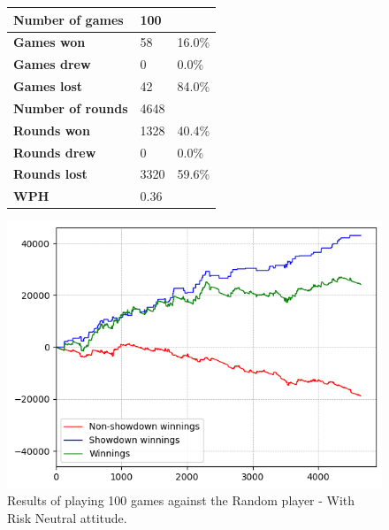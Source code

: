 \begin{figure}[H]
    \centering
    \begin{minipage}{\textwidth}
        \begin{minipage}{0.40\textwidth}
            \begin{tabular}{|l|l|l|}
                \hline
                \textbf{Number of games}  & 100   &        \\ \hline
                \textbf{Games won}        & 58    & 16.0\% \\ \hline
                \textbf{Games drew}       & 0     & 0.0\%  \\ \hline
                \textbf{Games lost}       & 42    & 84.0\% \\ \hline
                \textbf{Number of rounds} & 4648  &        \\ \hline
                \textbf{Rounds won}       & 1328   & 40.4\%  \\ \hline
                \textbf{Rounds drew}      & 0     & 0.0\%  \\ \hline
                \textbf{Rounds lost}      & 3320  & 59.6\% \\ \hline
                \textbf{WPH}              & 0.36  &        \\ \hline
            \end{tabular}
        \end{minipage}
        \hspace{0.05\textwidth}
        \begin{minipage}{0.5\textwidth}
            \includegraphics[width=\textwidth]{graphics/risk-neutral/random.png}
        \end{minipage}
    \end{minipage}
    \caption{Results of playing 100 games against the Random player - With Risk Neutral attitude.}
    \label{fig:results_neutral_random}
\end{figure}